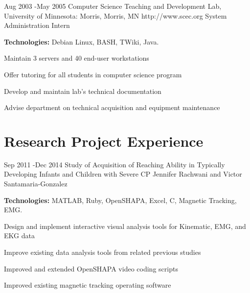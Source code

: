 \documentclass[10pt]{article} %
\begin{document}

\job
{Aug 2003 -}{May 2005}
{Computer Science Teaching and Development Lab, University of Minnesota: Morris, Morris, MN}
{http://www.scec.org}
{System Administration Intern}
{\rule{0mm}{5mm}\textbf{Technologies:} Debian Linux, BASH, TWiki, Java.

\begin{itemize-noindent}
\item{Maintain 3 servers and 40 end-user workstations}
\item{Offer tutoring for all students in computer science program}
\item{Develop and maintain lab's technical documentation}
\item{Advise department on technical acquisition and equipment maintenance}
\end{itemize-noindent}

}


\section{Research Project Experience}

\project
{Sep 2011 -}{Dec 2014}
{Study of Acquisition of Reaching Ability in Typically Developing Infants and Children with Severe CP}
{Jennifer Rachwani and Victor Santamaria-Gonzalez}
{\rule{0mm}{5mm}\textbf{Technologies:} MATLAB, Ruby, OpenSHAPA, Excel, C, Magnetic Tracking, EMG.

\begin{itemize-noindent}
\item{Design and implement interactive visual analysis tools for Kinematic, EMG, and EKG data}
\item{Improve existing data analysis tools from related previous studies}
\item{Improved and extended OpenSHAPA video coding scripts}
\item{Improved existing magnetic tracking operating software}
\end{itemize-noindent}

}
\end{document}
